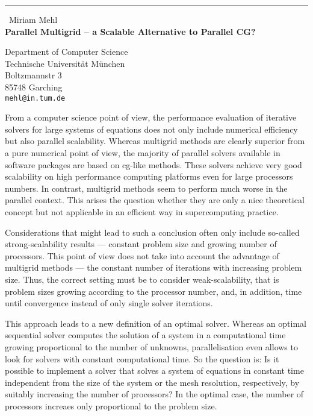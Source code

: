 \documentclass{report}
\begin{document}
\begin{center}
\rule{6in}{1pt} \
{\large Miriam Mehl \\
{\bf Parallel Multigrid -- a Scalable Alternative to Parallel CG?}}

Department of Computer Science \\ Technische Universit\"at M\"unchen \\ Boltzmannstr 3 \\ 85748 Garching
\\
{\tt mehl@in.tum.de}\end{center}

From a computer science point of view, the performance evaluation of
iterative solvers for large systems of equations
does not only include numerical efficiency but also parallel
scalability. Whereas multigrid methods are clearly superior from
a pure numerical point of view, the majority of parallel solvers
available in software packages are
based on cg-like methods.
These solvers achieve very good scalability on high performance
computing platforms even for large processors numbers. In contrast,
multigrid methods seem to perform much worse in the parallel context.
This arises the question whether they are only a nice theoretical
concept but not applicable in an efficient way in supercomputing
practice.

Considerations that might lead to such a conclusion often only include
so-called strong-scalability results --- constant problem size and
growing number of processors.
This point of view does not take into account the advantage of
multigrid methods --- the constant number of iterations with
increasing problem size.
Thus, the correct setting must be to consider weak-scalability, that
is problem sizes growing according to the processor number, and, in
addition, time until convergence instead of only single solver
iterations.

This approach leads to a new definition of an optimal solver.
Whereas an optimal sequential
solver computes the solution of a system in a computational
time growing proportional to the number of unknowns,
parallelisation even allows to look for solvers with
constant computational time.
So the question is: Is it possible
to implement a solver that solves a system of equations in constant
time independent from the size of the system or the mesh resolution,
respectively, by suitably increasing the number of processors?
In the optimal case, the number of processors increaes only proportional
to the problem size.
\end{document}
